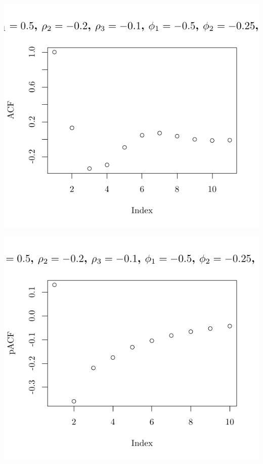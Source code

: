 \documentclass[10pt]{paper}\usepackage[]{graphicx}\usepackage[]{color}
\makeatletter
\def\maxwidth{ %
  \ifdim\Gin@nat@width>\linewidth
    \linewidth
  \else
    \Gin@nat@width
  \fi
}
\newenvironment{knitrout}{}{} %
\makeatother
\begin{document}
\begin{knitrout}
{\centering \includegraphics[width=\maxwidth]{figure/graphics-plotter-177} 

}




{\centering \includegraphics[width=\maxwidth]{figure/graphics-plotter-178} 

}





\end{knitrout}
\end{document}
